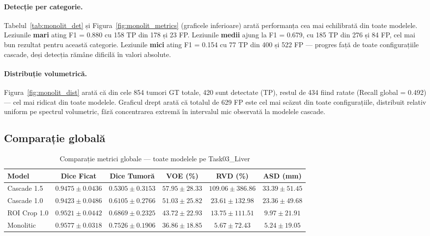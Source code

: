 \documentclass[12pt, a4paper]{report}
\begin{document}
\paragraph{Detecție per categorie.}
Tabelul~\ref{tab:monolit_det} și Figura~\ref{fig:monolit_metrics} (graficele inferioare) arată performanța cea mai echilibrată din toate modelele. Leziunile \textbf{mari} ating F1 = 0.880 cu 158 TP din 178 și 23 FP. Leziunile \textbf{medii} ajung la F1 = 0.679, cu 185 TP din 276 și 84 FP, cel mai bun rezultat pentru această categorie. Leziunile \textbf{mici} ating F1 = 0.154 cu 77 TP din 400 și 522 FP — progres față de toate configurațiile cascade, deși detecția rămâne dificilă în valori absolute.

\paragraph{Distribuție volumetrică.}
Figura~\ref{fig:monolit_dist} arată că din cele 854 tumori GT totale, 420 sunt detectate (TP), restul de 434 fiind ratate (Recall global = 0.492) — cel mai ridicat din toate modelele. Graficul drept arată că totalul de 629 FP este cel mai scăzut din toate configurațiile, distribuit relativ uniform pe spectrul volumetric, fără concentrarea extremă în intervalul mic observată la modelele cascade.
\clearpage

\subsection{Comparație globală}

\begin{table}[h]
\centering
\caption{Comparație metrici globale — toate modelele pe Task03\_Liver}
\begin{tabular}{lccccc}
\hline
\textbf{Model}
  & \textbf{Dice Ficat}
  & \textbf{Dice Tumoră}
  & \textbf{VOE (\%)}
  & \textbf{RVD (\%)}
  & \textbf{ASD (mm)} \\
\hline
Cascade 1.5         & $0.9475 \pm 0.0436$ & $0.5305 \pm 0.3153$ & $57.95 \pm 28.33$ & $109.06 \pm 386.86$ & $33.39 \pm 51.45$ \\
Cascade 1.0         & $0.9423 \pm 0.0486$ & $0.6105 \pm 0.2766$ & $51.03 \pm 25.82$ & $23.61 \pm 132.98$  & $23.36 \pm 49.68$ \\
ROI Crop 1.0    & $0.9521 \pm 0.0442$ & $0.6869 \pm 0.2325$ & $43.72 \pm 22.93$ & $13.75 \pm 111.51$  & $9.97 \pm 21.91$  \\
Monolitic           & $0.9577 \pm 0.0318$ & $0.7526 \pm 0.1906$ & $36.86 \pm 18.85$ & $5.67 \pm 72.43$    & $5.24 \pm 19.05$  \\
\hline
\end{tabular}
\end{table}
\end{document}
